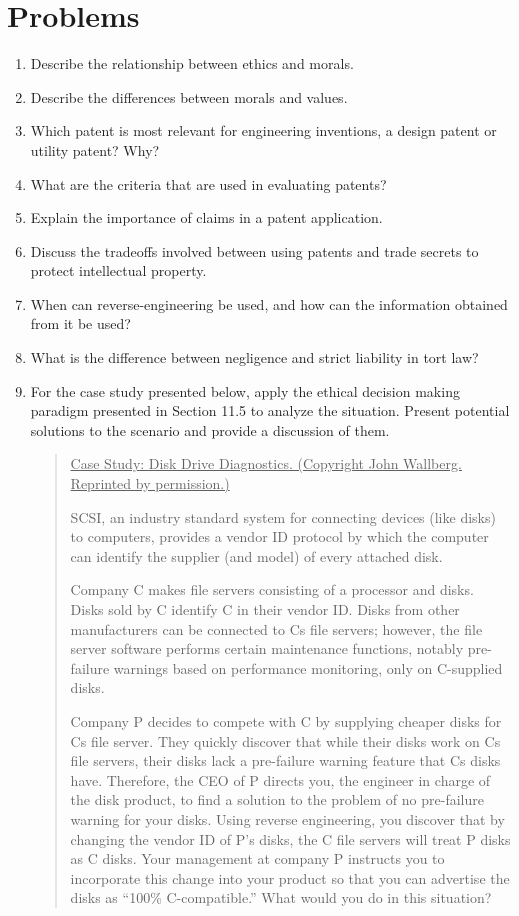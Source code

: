 \chapter{Problems}


\begin{enumerate}
\def\labelenumi{\arabic{enumi}.}
\item
  Describe the relationship between ethics and morals.
\item
  Describe the differences between morals and values.
\item
  Which patent is most relevant for engineering inventions, a design
  patent or utility patent? Why?
\item
  What are the criteria that are used in evaluating patents?
\item
  Explain the importance of claims in a patent application.
\item
  Discuss the tradeoffs involved between using patents and trade secrets
  to protect intellectual property.
\item
  When can reverse-engineering be used, and how can the information
  obtained from it be used?
\item
  What is the difference between negligence and strict liability in tort
  law?
\item
  For the case study presented below, apply the ethical decision making
  paradigm presented in Section 11.5 to analyze the situation. Present
  potential solutions to the scenario and provide a discussion of them.

\begin{quote}
\ul{\hfill\break
Case Study: Disk Drive Diagnostics. (Copyright John Wallberg. Reprinted
by permission.)}

SCSI, an industry standard system for connecting devices (like disks) to
computers, provides a vendor ID protocol by which the computer can
identify the supplier (and model) of every attached disk.

Company C makes file servers consisting of a processor and disks. Disks
sold by C identify C in their vendor ID. Disks from other manufacturers
can be connected to C\textquotesingle s file servers; however, the file
server software performs certain maintenance functions, notably
pre-failure warnings based on performance monitoring, only on C-supplied
disks.

Company P decides to compete with C by supplying cheaper disks for
C\textquotesingle s file server. They quickly discover that while their
disks work on C\textquotesingle s file servers, their disks lack a
pre-failure warning feature that C\textquotesingle s disks have.
Therefore, the CEO of P directs you, the engineer in charge of the disk
product, to find a solution to the problem of no pre-failure warning for
your disks. Using reverse engineering, you discover that by changing the
vendor ID of P's disks, the C file servers will treat P disks as C
disks. Your management at company P instructs you to incorporate this
change into your product so that you can advertise the disks as ``100\%
C-compatible.'' What would you do in this situation?
\end{quote}



\end{enumerate}
